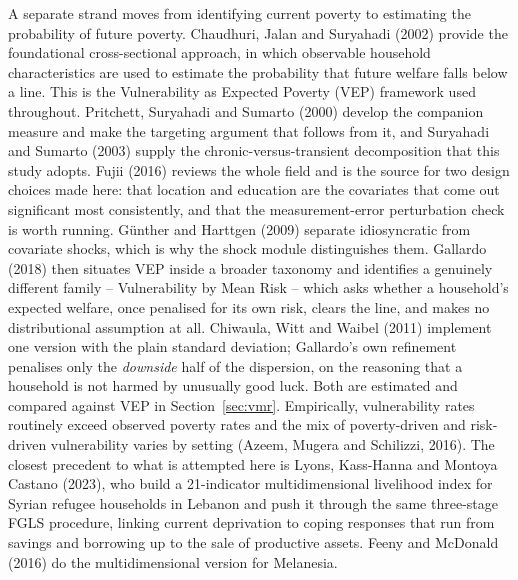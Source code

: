\documentclass[11pt]{article}
\begin{document}
A separate strand moves from identifying current poverty to estimating the probability of
future poverty. Chaudhuri, Jalan and Suryahadi (2002) provide the foundational
cross-sectional approach, in which observable household characteristics are used to estimate
the probability that future welfare falls below a line. This is the Vulnerability as Expected
Poverty (VEP) framework used throughout. Pritchett, Suryahadi and Sumarto (2000) develop the
companion measure and make the targeting argument that follows from it, and Suryahadi and
Sumarto (2003) supply the chronic-versus-transient decomposition that this study adopts.
Fujii (2016) reviews the whole field and is the source for two design choices made here: that
location and education are the covariates that come out significant most consistently, and
that the measurement-error perturbation check is worth running. Günther and Harttgen (2009)
separate idiosyncratic from covariate shocks, which is why the shock module distinguishes
them. Gallardo (2018) then situates VEP inside a broader taxonomy and identifies a genuinely
different family -- Vulnerability by Mean Risk -- which asks whether a household's expected
welfare, once penalised for its own risk, clears the line, and makes no distributional
assumption at all. Chiwaula, Witt and Waibel (2011) implement one version with the plain
standard deviation; Gallardo's own refinement penalises only the \emph{downside} half of the
dispersion, on the reasoning that a household is not harmed by unusually good luck. Both are
estimated and compared against VEP in Section~\ref{sec:vmr}. Empirically, vulnerability rates
routinely exceed observed poverty rates and the mix of poverty-driven and risk-driven
vulnerability varies by setting (Azeem, Mugera and Schilizzi, 2016). The closest precedent to
what is attempted here is Lyons, Kass-Hanna and Montoya Castano (2023), who build a
21-indicator multidimensional livelihood index for Syrian refugee households in Lebanon and
push it through the same three-stage FGLS procedure, linking current deprivation to coping
responses that run from savings and borrowing up to the sale of productive assets. Feeny and
McDonald (2016) do the multidimensional version for Melanesia.
\end{document}
